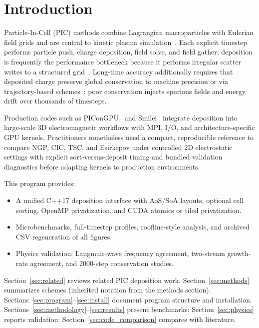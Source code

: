 \section{Introduction}
\label{sec:intro}

Particle-In-Cell (PIC) methods combine Lagrangian macroparticles with Eulerian field grids and are central to kinetic plasma simulation~\cite{birdsall1991,hockney1988,dawson1983}.
Each explicit timestep performs particle push, charge deposition, field solve, and field gather; deposition is frequently the performance bottleneck because it performs irregular scatter writes to a structured grid~\cite{viereck2016}.
Long-time accuracy additionally requires that deposited charge preserve global conservation to machine precision or via trajectory-based schemes~\cite{brackbill1980,esirkepov2001}; poor conservation injects spurious fields and energy drift over thousands of timesteps.

Production codes such as PIConGPU~\cite{burau2010,steiniger2023} and Smilei~\cite{derouillat2018,beck2019} integrate deposition into large-scale 3D electromagnetic workflows with MPI, I/O, and architecture-specific GPU kernels.
Practitioners nonetheless need a compact, reproducible reference to compare NGP, CIC, TSC, and Esirkepov under controlled 2D electrostatic settings with explicit sort-versus-deposit timing and bundled validation diagnostics before adapting kernels to production environments.

This program provides:
\begin{itemize}
    \item A unified C++17 deposition interface with AoS/SoA layouts, optional cell sorting, OpenMP privatization, and CUDA atomics or tiled privatization.
    \item Microbenchmarks, full-timestep profiles, roofline-style analysis, and archived CSV regeneration of all figures.
    \item Physics validation: Langmuir-wave frequency agreement, two-stream growth-rate agreement, and 2000-step conservation studies.
\end{itemize}

Section~\ref{sec:related} reviews related PIC deposition work.
Section~\ref{sec:methods} summarizes schemes (inherited notation from the methods section).
Sections~\ref{sec:program}--\ref{sec:install} document program structure and installation.
Sections~\ref{sec:methodology}--\ref{sec:results} present benchmarks; Section~\ref{sec:physics} reports validation; Section~\ref{sec:code_comparison} compares with literature.
